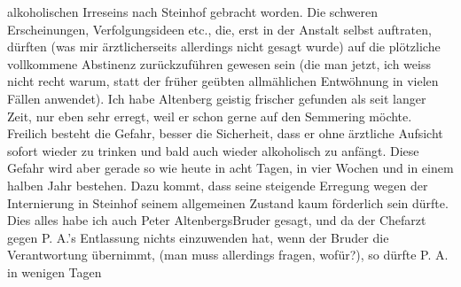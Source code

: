 \begin{ledgroupsized}[t]{13cm}
               alkoholischen Irreseins nach Steinhof gebracht
               worden. Die schweren Erscheinungen, Verfolgungsideen etc., die, erst in der Anstalt
               selbst auftraten, dürften (was mir ärztlicherseits allerdings nicht gesagt wurde) auf
               die plötzliche vollkommene Abstinenz zurückzuführen gewesen sein (die man jetzt, ich
               weiss nicht recht warum, statt der früher geübten allmählichen Entwöhnung in vielen
               Fällen anwendet). Ich habe Altenberg geistig
               frischer gefunden als seit langer Zeit, nur eben sehr erregt, weil er schon gerne auf
               den Semmering möchte. Freilich besteht die Gefahr,
               besser die Sicherheit, dass er ohne ärztliche Aufsicht sofort wieder zu trinken und
               bald auch wieder alkoholisch {\pb}zu \label{K_L02129_2v}\label{K_L02129_2h} anfängt. Diese Gefahr wird aber gerade so
               wie heute in acht Tagen, in vier Wochen und in einem halben Jahr bestehen. Dazu
               kommt, dass seine steigende Erregung wegen der Internierung in Steinhof seinem allgemeinen Zustand kaum förderlich sein dürfte.
               Dies alles habe ich auch Peter AltenbergsBruder gesagt, und da  der Chefarzt gegen P. A.’s
               Entlassung nichts einzuwenden hat, wenn der Bruder die Verantwortung übernimmt, (man muss allerdings
               fragen, wofür?), so dürfte P. A. in wenigen Tagen

\end{ledgroupsized}
